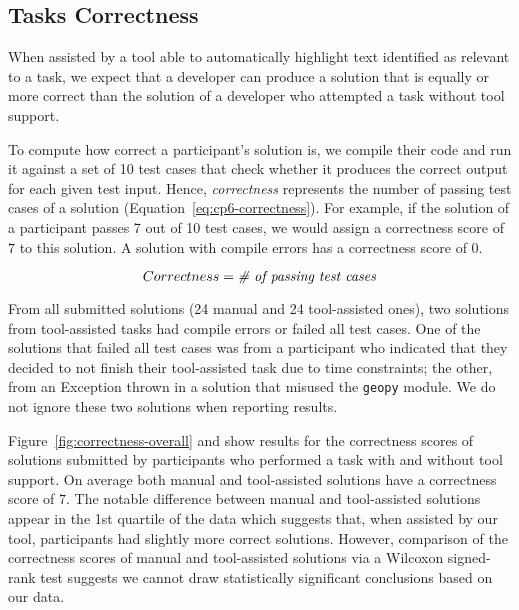 
\subsection{Tasks Correctness}
\label{cp6:correctness}



When assisted by a tool able to automatically highlight text identified as relevant to a task, we expect that a developer can produce a solution 
that is equally or more correct than the solution of a developer who attempted a task without tool support. 


To compute how correct a participant's solution is, 
we compile their code and run it against a set of 10 test cases that check whether it produces the correct output for each given test input. 
Hence, \textit{correctness} represents the number of passing test cases of a solution (Equation~\ref{eq:cp6-correctness}).
For example, if the solution of a participant passes 7 out of 10 test cases, we would assign a 
correctness score of $7$ to this solution. 
A solution with compile errors has a correctness score of $0$.


\smallskip
\begin{small}


\begin{equation}
    Correctness = \text{\textit{\# of passing test cases}}
    \label{eq:cp6-correctness}
\end{equation}
\end{small}



\smallskip


From all submitted solutions (24 manual and 24 tool-assisted ones), two 
solutions from tool-assisted tasks had compile errors or failed all test cases. 
One of the solutions that failed all test cases
was from a participant who indicated that they decided to not finish their tool-assisted task due to time constraints; the other, from an Exception thrown in a solution that misused the \texttt{geopy} module. We do not ignore these two solutions when reporting results.


Figure~\ref{fig:correctness-overall} and 
show results for the correctness scores of solutions submitted by participants
who performed a task with and without tool support. 
On average both manual and tool-assisted solutions have a correctness score of $7$.
The notable difference between manual and tool-assisted solutions appear in the 1st quartile of the data which suggests that, 
when assisted by our tool, participants had slightly more correct solutions. 
However, comparison of the correctness scores of manual and tool-assisted solutions via a 
Wilcoxon signed-rank test suggests we cannot draw statistically significant conclusions
based on our data.



